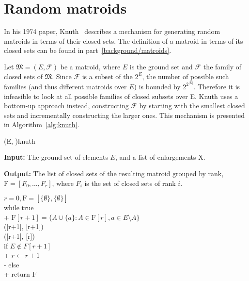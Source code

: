\chapter{Random matroids}\label{random-matroids}

In his 1974 paper, Knuth~\cite{knuth-1975} describes a mechanism for generating random matroids in terms of their closed sets. The definition of a matroid in terms of its closed sets can be found in part~\ref{background/matroids}.

Let $\mathfrak{M} = (E, \mathcal{F})$ be a matroid, where $E$ is the ground set and $\mathcal{F}$ the family of closed sets of $\mathfrak{M}$. Since $\mathcal{F}$ is a subset of the $2^E$, the number of possible such families (and thus different matroids over $E$) is bounded by $2^{2^{|E|}}$. Therefore it is infeasible to look at all possible families of closed subsets over E. Knuth uses a bottom-up approach instead, constructing $\mathcal{F}$ by starting with the smallest closed sets and incrementally constructing the larger ones. This mechanism is presented in Algorithm~\ref{alg:knuth}.

\begin{algorithm}[float*=ht,width=\textwidth]{(E, )}{knuth}

  \textbf{Input:} The ground set of elements $E$, and a list of enlargements $\mathrm{X}$.

  \textbf{Output:} The list of closed sets of the resulting matroid grouped by rank, $\mathrm{F} = [F_0, \ldots, F_r]$, where $F_i$ is the set of closed sets of rank $i$.

  \begin{pseudo}[label=\small\arabic*, indent-mark, line-height=1.1]
    $r = 0, \mathrm{F} = [\{ \emptyset \}, \{ \emptyset \}]$ \\
    while true  \\+
    $\mathrm{F}[r+1] = \{ A \cup \{a\} : A \in \mathrm{F}[r], a \in E \setminus A \}$\\
    ([r+1], [r+1]) \\
    ([r+1], [r]) \\

    if $E \not \in F[r+1]$ \\+
    $r \leftarrow r+1$ \\-
    else \\+
    return $\mathrm{F}$

  \end{pseudo}

\end{algorithm}

